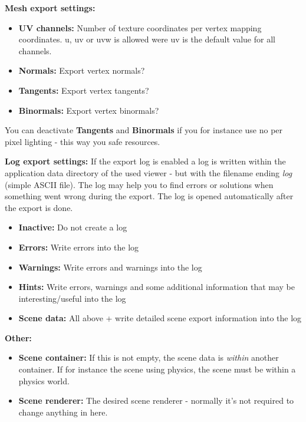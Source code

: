 \textbf{Mesh export settings:}
\begin{itemize}
\item{\textbf{UV channels:} Number of texture coordinates per vertex mapping coordinates. u, uv or uvw is allowed were uv is the default value for all channels.}
\item{\textbf{Normals:} Export vertex normals?}
\item{\textbf{Tangents:} Export vertex tangents?}
\item{\textbf{Binormals:} Export vertex binormals?}
\end{itemize}

You can deactivate \textbf{Tangents} and \textbf{Binormals} if you for instance use no per pixel lighting - this way you safe resources.

\textbf{Log export settings:}
If the export log is enabled a log is written within the application data directory of the used viewer - but with the filename ending \emph{log} (simple \ac{ASCII} file). The log may help you to find errors or solutions when something went wrong during the export. The
log is opened automatically after the export is done.
\begin{itemize}
\item{\textbf{Inactive:} Do not create a log}
\item{\textbf{Errors:} Write errors into the log}
\item{\textbf{Warnings:} Write errors and warnings into the log}
\item{\textbf{Hints:} Write errors, warnings and some additional information that may be interesting/useful into the log}
\item{\textbf{Scene data:} All above + write detailed scene export information into the log}
\end{itemize}

\textbf{Other:}
\begin{itemize}
\item{\textbf{Scene container:} If this is not empty, the scene data is \emph{within} another container. If for instance the scene using physics, the scene must be within a physics world.}
\item{\textbf{Scene renderer:} The desired scene renderer - normally it's not required to change anything in here.}
\end{itemize}
